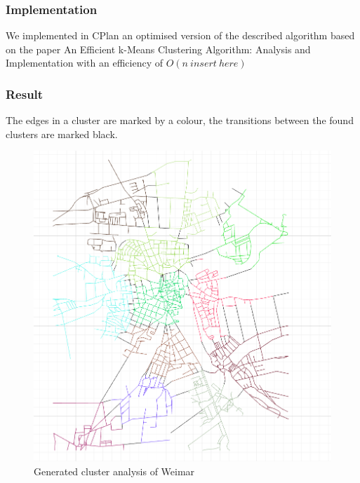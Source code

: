 \documentclass[11pt, a4paper]{report}
\begin{document}
\subsubsection{Implementation}
We implemented in CPlan\citep{cPlan:2015} an optimised version of the described algorithm based on the paper An Efficient k-Means Clustering Algorithm: Analysis and Implementation \cite{kmeans:2002} with an efficiency of $O(n\ insert\ here)$

\pagebreak
\subsubsection{Result}
The edges in a cluster are marked by a colour, the transitions between the found clusters are marked black.
\begin{figure}[!h]
    \centering
    \includegraphics[width=\textwidth]{clusteranalysis_kmeans_result.png}
    \caption{Generated cluster analysis of Weimar\label{fig:KmeansGenerated}}
\end{figure}
\pagebreak
\end{document}
